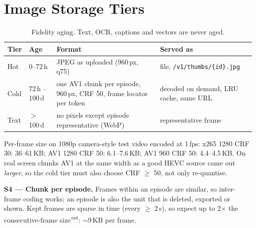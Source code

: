 \documentclass[11pt,a4paper]{article}
\newcommand{\est}{\textsuperscript{\color{mmorange}\,est}}
\begin{document}
\section{Image Storage Tiers}
\begin{table}[h]\centering\small
\begin{tabular}{P{1.6cm}P{3.0cm}P{4.4cm}P{4.4cm}}\toprule
\textbf{Tier} & \textbf{Age} & \textbf{Format} & \textbf{Served as}\\\midrule
Hot & 0--72\,h & JPEG as uploaded (960\,px, q75) & file, \texttt{/v1/thumbs/\{id\}.jpg}\\
Cold & 72\,h -- 100\,d & one AV1 chunk per episode, 960\,px, CRF 50, frame locator per token & decoded on demand, LRU cache, same URL\\
Text & $>$ 100\,d & no pixels except episode representative (WebP) & representative frame\\\bottomrule
\end{tabular}
\caption{Fidelity aging. Text, OCR, captions and vectors are never aged.}
\end{table}

\begin{measured}
Per-frame size on 1080p camera-style test video encoded at 1\,fps: x265 1280 CRF 30: 36--61\,KB; AV1 1280 CRF 50: 6.1--7.6\,KB; AV1 960 CRF 50: 4.4--4.5\,KB. On real screen chunks AV1 at the same width as a good HEVC source came out \emph{larger}, so the cold tier must also choose CRF $\ge$ 50, not only re-quantise.
\end{measured}

\begin{decision}
\textbf{S4 --- Chunk per episode.} Frames within an episode are similar, so inter-frame coding works; an episode is also the unit that is deleted, exported or shown. Kept frames are sparse in time (every $\ge$ 2\,s), so expect up to 2$\times$ the consecutive-frame size\est: $\sim$9\,KB per frame.
\end{decision}
\end{document}
